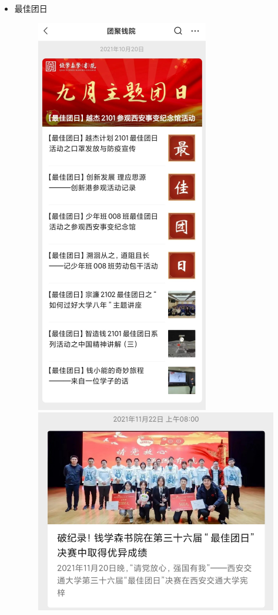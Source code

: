 \documentclass[
decoration,  %
]{qyxf-book}
\begin{document}
\begin{itemize}
		\item 最佳团日
		\begin{figure}[H]
			\centering
			\includegraphics[]{pics/zjtr.png}
			\includegraphics[]{pics/zjtr1.png}
		\end{figure}
	\end{itemize}
	
\end{document}
